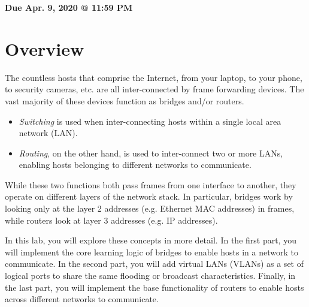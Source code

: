 \documentclass[11pt]{article}
\makeatletter
\def\datedue{Apr. 9, 2020 @ 11:59 PM}
\makeatother
\begin{document}
\maketitle \thispagestyle{fancy}

\hfill {\large \textbf{Due \datedue}}


\section{Overview}
\label{sec:overview}
The countless hosts that comprise the Internet, from your laptop, to your phone, to security cameras, etc. are all inter-connected by frame forwarding devices.
The vast majority of these devices function as bridges and/or routers.
\begin{itemize}
    \item \textit{Switching} is used when inter-connecting hosts within a single local area network (LAN).
    \item \textit{Routing}, on the other hand, is used to inter-connect two or more LANs, enabling hosts belonging to different networks to communicate.
\end{itemize}
While these two functions both pass frames from one interface to another, they operate on different layers of the network stack.
In particular, bridges work by looking only at the layer 2 addresses (e.g. Ethernet MAC addresses) in frames, while routers look at layer 3 addresses (e.g. IP addresses).

In this lab, you will explore these concepts in more detail.
In the first part, you will implement the core learning logic of bridges to enable hosts in a network to communicate.
In the second part, you will add virtual LANs (VLANs) as a set of logical ports to share the same flooding or broadcast characteristics.
Finally, in the last part, you will implement the base functionality of routers to enable hosts across different networks to communicate.


\end{document}
